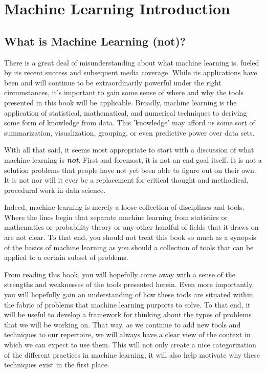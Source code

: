 \chapter{Machine Learning Introduction}

\section{What is Machine Learning (not)?}
There is a great deal of misunderstanding about what machine learning is, fueled by its recent success and subsequent media coverage. While its applications have been and will continue to be extraordinarily powerful under the right circumstances, it's important to gain some sense of where and why the tools presented in this book will be applicable. Broadly, machine learning is the application of statistical, mathematical, and numerical techniques to deriving some form of knowledge from data. This 'knowledge' may afford us some sort of summarization, visualization, grouping, or even predictive power over data sets.

With all that said, it seems most appropriate to start with a discussion of what machine learning is \textbf{\textit{not}}. First and foremost, it is not an end goal itself. It is not a solution problems that people have not yet been able to figure out on their own. It is not nor will it ever be a replacement for critical thought and methodical, procedural work in data science.

Indeed, machine learning is merely a loose collection of disciplines and tools. Where the lines begin that separate machine learning from statistics or mathematics or probability theory or any other handful of fields that it draws on are not clear. To that end, you should not treat this book so much as a synopsis of the basics of machine learning as you should a collection of tools that can be applied to a certain subset of problems.

From reading this book, you will hopefully come away with a sense of the strengths and weaknesses of the tools presented herein. Even more importantly, you will hopefully gain an understanding of how these tools are situated within the fabric of problems that machine learning purports to solve. To that end, it will be useful to develop a framework for thinking about the types of problems that we will be working on. That way, as we continue to add new tools and techniques to our repertoire, we will always have a clear view of the context in which we can expect to use them. This will not only create a nice categorization of the different practices in machine learning, it will also help motivate why these techniques exist in the first place.

